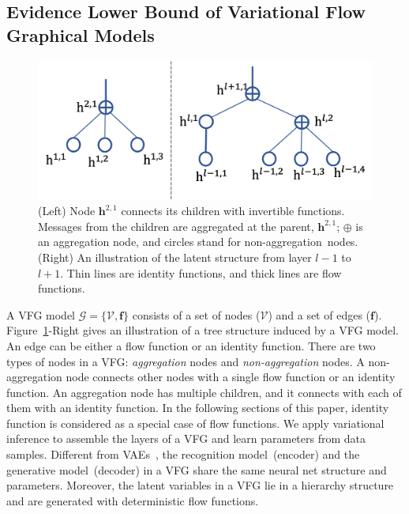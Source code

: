 \documentclass{article}
\begin{document}
\subsection{Evidence Lower Bound of Variational Flow Graphical Models}
\begin{figure}
\vspace{-0.35in}
\begin{center}
 \includegraphics[width=1.0\linewidth]{fig/tree_node.png}
\end{center}
\vspace{-0.15in}
\caption{\small  (Left)  Node $\mathbf{h}^{2, 1}$ connects its children with invertible functions. Messages from the children are aggregated at the parent, $\mathbf{h}^{2,1}$; $\oplus$ is an aggregation node, and circles stand for non-aggregation~nodes.(Right) An illustration of the latent structure from layer $l-1$ to $l+1$.  Thin lines are identity functions, and thick lines are flow functions.  }
\label{fig:tree}
\vspace{-0.1in}
\end{figure}
A VFG model  $\mathcal{G}=\{\mathcal{V}, \mathbf{f}\} $ consists of a set of nodes ($\mathcal{V}$) and a set of edges ($\mathbf{f}$).
Figure~\ref{fig:tree}-Right gives an illustration of a tree structure induced by a VFG model. An edge can be either a flow function or an identity function. There are two types of nodes in a VFG: \emph{aggregation} nodes and \emph{non-aggregation} nodes. 
A non-aggregation node connects other nodes with a single flow function or an identity function. An aggregation node has multiple children, and it  connects with each of  them with an identity function. 
In the following sections of this paper, identity function is considered as a special case of flow functions.
We apply variational inference to assemble the layers of a VFG and learn parameters from data samples. Different from VAEs~\cite{kingma2013auto,rezende2014stochastic}, the recognition model~(encoder) and the generative model~(decoder) in a VFG share the same  neural net structure and parameters. Moreover, the latent variables in a VFG lie in a hierarchy structure and  are generated with deterministic flow functions.
\end{document}
